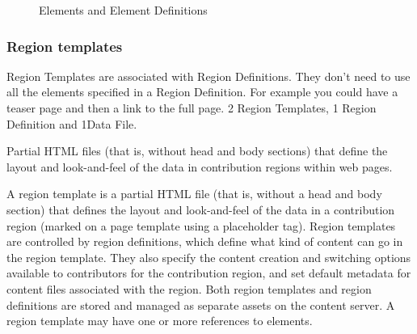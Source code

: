 \begin{figure}[h!]
  \centering
  \caption{Elements and Element Definitions}
\end{figure}



\subsubsection{Region templates}

Region Templates are associated with Region Definitions.  They don’t
need to use all the elements specified in a Region Definition.  For
example you could have a teaser page and then a link to the full page.
2 Region Templates, 1 Region Definition and 1Data File.

Partial HTML files (that is, without head and body sections) that
define the layout and look-and-feel of the data in contribution
regions within web pages.

A region template is a partial HTML file (that is, without a head and
body section) that defines the layout and look-and-feel of the data in
a contribution region (marked on a page template using a placeholder
tag). Region templates are controlled by region definitions, which
define what kind of content can go in the region template. They also
specify the content creation and switching options available to
contributors for the contribution region, and set default metadata for
content files associated with the region. Both region templates and
region definitions are stored and managed as separate assets on the
content server. A region template may have one or more references to
elements.

